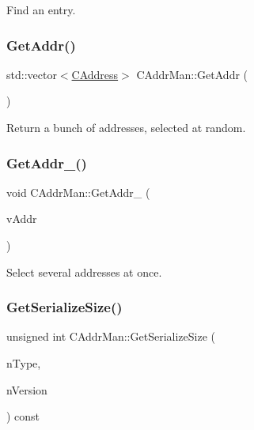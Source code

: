 Find an entry. 

\mbox{\label{class_c_addr_man_a69cc6138e696cf88de60925d26023bf2}} 
\subsubsection{\texorpdfstring{Get\+Addr()}{GetAddr()}}
{\footnotesize\ttfamily std\+::vector$<$\mbox{\hyperlink{class_c_address}{C\+Address}}$>$ C\+Addr\+Man\+::\+Get\+Addr (\begin{DoxyParamCaption}{ }\end{DoxyParamCaption})\hspace{0.3cm}{\ttfamily [inline]}}



Return a bunch of addresses, selected at random. 

\mbox{\label{class_c_addr_man_aff86d04dc7c0e0afae3ff5998417db17}} 
\subsubsection{\texorpdfstring{Get\+Addr\+\_\+()}{GetAddr\_()}}
{\footnotesize\ttfamily void C\+Addr\+Man\+::\+Get\+Addr\+\_\+ (\begin{DoxyParamCaption}\item[{std\+::vector$<$ \mbox{\hyperlink{class_c_address}{C\+Address}} $>$ \&}]{v\+Addr }\end{DoxyParamCaption})\hspace{0.3cm}{\ttfamily [protected]}}



Select several addresses at once. 

\mbox{\label{class_c_addr_man_a958c50de16b0d7fa068cce22a4cd8cb9}} 
\subsubsection{\texorpdfstring{Get\+Serialize\+Size()}{GetSerializeSize()}}
{\footnotesize\ttfamily unsigned int C\+Addr\+Man\+::\+Get\+Serialize\+Size (\begin{DoxyParamCaption}\item[{int}]{n\+Type,  }\item[{int}]{n\+Version }\end{DoxyParamCaption}) const\hspace{0.3cm}{\ttfamily [inline]}}

